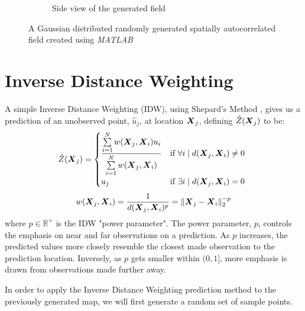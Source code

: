\documentclass[11pt]{ucthesis}
\newcommand{\vect}[1]{{\it{\boldsymbol{#1}}}}
\begin{document}
\begin{figure}[ht!]
\begin{subfigure}[t]{0.5\textwidth}
		\captionsetup{skip=0.5\baselineskip,size=footnotesize}
		\caption{Side view of the generated field}
		\label{fig:side_view_field}
    \end{subfigure}

    \captionsetup{skip=0.5\baselineskip,size=footnotesize}
    \caption{A Gaussian distributed randomly generated spatially autocorrelated field created using \textit{MATLAB}}
    \label{fig:gen_field}
\end{figure}

\section{Inverse Distance Weighting}
A simple Inverse Distance Weighting (IDW), using Shepard's Method \cite{shepard:idw}, gives us a prediction of an unobserved point, $\hat{u}_j$, at location $\vect{X}_j$, defining $\hat{Z}(\vect{X}_j)$ to be:
\begin{equation}
	\hat{Z}(\vect{X}_j)=\begin{cases}
			\dfrac{\sum\limits_{i=1}^N w(\vect{X}_j, \vect{X}_i)u_i}{\sum\limits_{i=1}^{N} w(\vect{X}_j, \vect{X}_i)} & \text{if}\ \forall i \mid d(\vect{X}_j,\vect{X}_i) \neq 0\ \\
			u_j & \text{if}\ \exists i \mid d(\vect{X}_j,\vect{X}_i)=0\\
		\end{cases}
\end{equation}
\begin{equation}
	w(\vect{X}_j, \vect{X}_i)=\frac{1}{d(\vect{X}_j,\vect{X}_{i})^{p}}=\|\vect{X}_j-\vect{X}_i\|_{2}^{-p}
\end{equation}
where $p \in \mathbb{R}^{+}$ is the IDW "power parameter". The power parameter, $p$, controls the emphasis on near and far observations on a prediction. As $p$ increases, the predicted values more closely resemble the closest made observation to the prediction location. Inversely, as $p$ gets smaller within $(0, 1]$, more emphasis is drawn from observations made further away.

In order to apply the Inverse Distance Weighting prediction method to the previously generated map, we will first generate a random set of sample points.
\end{document}
